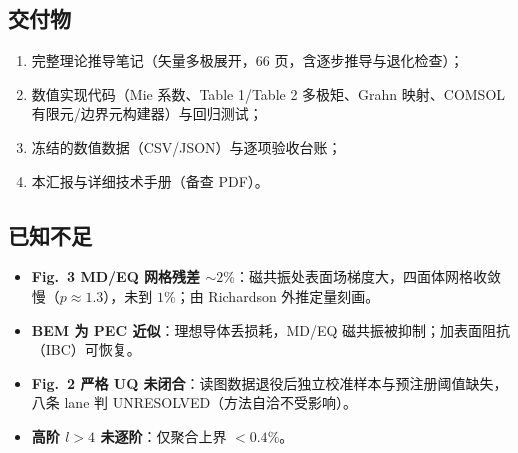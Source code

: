 \subsection{交付物}

\begin{enumerate}
  \item 完整理论推导笔记（矢量多极展开，66 页，含逐步推导与退化检查）；
  \item 数值实现代码（Mie 系数、Table 1/Table 2 多极矩、Grahn 映射、COMSOL 有限元/边界元构建器）与回归测试；
  \item 冻结的数值数据（CSV/JSON）与逐项验收台账；
  \item 本汇报与详细技术手册（备查 PDF）。
\end{enumerate}

\subsection{已知不足}

\begin{itemize}
  \item \textbf{Fig.~3 MD/EQ 网格残差 $\sim2\%$}：磁共振处表面场梯度大，四面体网格收敛慢（$p\approx1.3$），未到 $1\%$；由 Richardson 外推定量刻画。
  \item \textbf{BEM 为 PEC 近似}：理想导体丢损耗，MD/EQ 磁共振被抑制；加表面阻抗（IBC）可恢复。
  \item \textbf{Fig.~2 严格 UQ 未闭合}：读图数据退役后独立校准样本与预注册阈值缺失，八条 lane 判 UNRESOLVED（方法自洽不受影响）。
  \item \textbf{高阶 $l>4$ 未逐阶}：仅聚合上界 $<0.4\%$。
\end{itemize}
